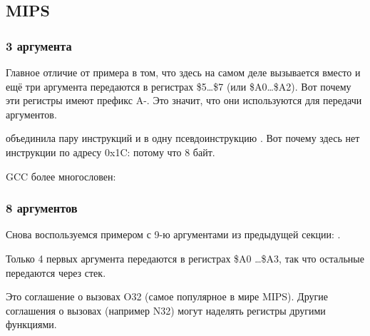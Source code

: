 \subsection{MIPS}

\subsubsection{3 аргумента}


Главное отличие от примера \q{\HelloWorldSectionName} в том, что здесь на самом деле
вызывается \printf вместо \puts и ещё три аргумента передаются в регистрах  \$5\dots \$7 (или \$A0\dots \$A2).
Вот почему эти регистры имеют префикс A-. Это значит, что они используются для передачи аргументов.





\IDA объединила пару инструкций  и  в одну псевдоинструкцию .
Вот почему здесь нет инструкции по адресу 0x1C: потому что   8 байт.


\NonOptimizing GCC более многословен:





\subsubsection{8 аргументов}

Снова воспользуемся примером с 9-ю аргументами из предыдущей секции: .




Только 4 первых аргумента передаются в регистрах \$A0 \dots \$A3, так что остальные передаются через стек.

Это соглашение о вызовах O32 (самое популярное в мире MIPS).
Другие соглашения о вызовах (например N32) могут наделять регистры другими функциями.

